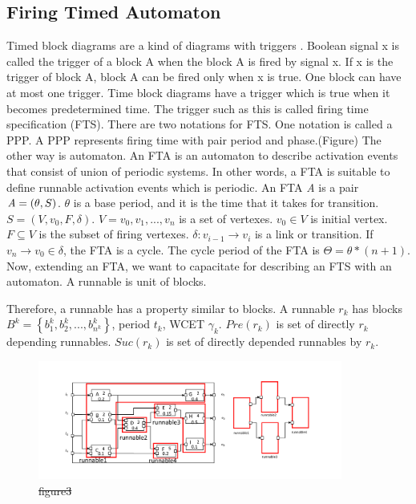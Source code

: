 \documentclass[conference,compsoc]{IEEEtran}
\providecommand{\DIFadd}[1]{{\protect\color{blue}\uwave{#1}}} %
\providecommand{\DIFdel}[1]{{\protect\color{red}\sout{#1}}}                      %
\providecommand{\DIFaddbegin}{} %
\providecommand{\DIFaddend}{} %
\providecommand{\DIFaddFL}[1]{\DIFadd{#1}} %
\providecommand{\DIFdelFL}[1]{\DIFdel{#1}} %
\providecommand{\DIFaddbeginFL}{} %
\providecommand{\DIFaddendFL}{} %
\providecommand{\DIFdelbeginFL}{} %
\providecommand{\DIFdelendFL}{} %
\begin{document}
\subsection{Firing Timed Automaton}
 Timed block diagrams are a kind of diagrams with triggers \cite{Lublinerman:2009:MCG:1480881.1480893}.
Boolean signal x is called the trigger of a block A when the block A is fired by signal x. 
If x is the trigger of block A, block A can be fired only when x is true.
One block can have at most one trigger.
Time block diagrams have a trigger which is true when it becomes predetermined time.
The trigger such as this is called firing time specification (FTS).
There are two notations for FTS.
One notation is called a PPP.
A PPP represents firing time with pair period and phase.(Figure)
The other way is  automaton.
An FTA is an automaton to describe activation events that consist of union of periodic systems.
In other words, a FTA is suitable to define runnable activation events which is periodic.
 An FTA {\it A} is a pair ${\it A} = (\theta,S)$. $\theta$ is a base period, and it is  the time that it takes for transition. 
$S = (V,v_0,F,\delta)$.
$V = {v_0,v_1,...,v_n}$ is a set of vertexes.
$v_0 \in V$ is initial vertex.
$F \subseteq V$ is the subset of firing vertexes.
$\delta : v_{i-1} \rightarrow v_{i}$ is a link or transition.
If $v_n \rightarrow v_0 \in \delta$, the FTA is a cycle.
The cycle period of the FTA is $\Theta = \theta * (n+1)$.
Now, extending an FTA, we want to capacitate for describing an FTS with an automaton.
A runnable is unit of blocks.

Therefore, a runnable has a property similar to blocks.
A runnable $r_k$ has blocks $B^k = \left\{b_1^k,b_2^k,...,b_{n^k}^k\right\}$, period $t_k$, WCET $\gamma_k$.
$Pre(r_k)$ is \DIFaddbegin \DIFadd{a }\DIFaddend set of directly $r_k$ depending runnables.
$Suc(r_k)$ is \DIFaddbegin \DIFadd{a }\DIFaddend set of directly depended runnables by $r_k$.

\begin{figure}
	\centering
	\includegraphics[width=10cm,clip]{figure7.pdf}
	\caption{\DIFdelbeginFL \DIFdelFL{figure3}\DIFdelendFL \DIFaddbeginFL \DIFaddFL{generated runnables from Figure 2}\DIFaddendFL }
	\label{fig3}
\end{figure}
\end{document}
